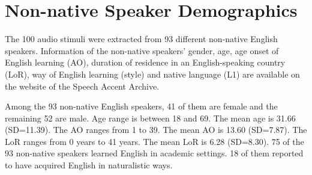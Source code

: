\label{ap:A}
\section{Non-native Speaker Demographics}

The 100 audio stimuli were extracted from 93 different non-native English speakers. Information of the non-native speakers' gender, age, age onset of English learning (AO), duration of residence in an English-speaking country (LoR), way of English learning (style) and native language (L1) are available on the website of the Speech Accent Archive. 

Among the 93 non-native English speakers, 41 of them are female and the remaining 52 are male. Age range is between 18 and 69. The mean age is 31.66 (SD=11.39). The AO ranges from 1 to 39. The mean AO is 13.60 (SD=7.87). The LoR ranges from 0 years to 41 years. The mean LoR is 6.28 (SD=8.30). 75 of the 93 non-native speakers learned English in academic settings. 18 of them reported to have acquired English in naturalistic ways.

